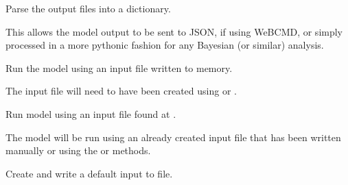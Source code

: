 \documentclass[letterpaper,10pt,english]{sphinxmanual}
\begin{document}
\begin{fulllineitems}
\begin{fulllineitems}
\end{fulllineitems}


\begin{fulllineitems}
\label{\detokenize{bcmdModel:bayescmd.bcmdModel.ModelBCMD.output_parse}}
Parse the output files into a dictionary.

This allows the model output to be sent to JSON, if using WeBCMD, or
simply processed in a more pythonic fashion for any Bayesian (or
similar) analysis.

\end{fulllineitems}


\begin{fulllineitems}
\label{\detokenize{bcmdModel:bayescmd.bcmdModel.ModelBCMD.run_from_buffer}}
Run the model using an input file written to memory.

The input file will need to have been created using
 or .

\end{fulllineitems}


\begin{fulllineitems}
\label{\detokenize{bcmdModel:bayescmd.bcmdModel.ModelBCMD.run_from_file}}
Run model using an input file found at {\hyperref[\detokenize{bcmdModel:bayescmd.bcmdModel.bcmd_model.ModelBCMD.input_file}]{}}.

The model will be run using an already created input file that has been
written manually or using the  or
 methods.

\end{fulllineitems}


\begin{fulllineitems}
\label{\detokenize{bcmdModel:bayescmd.bcmdModel.ModelBCMD.write_default_input}}
Create and write a default input to file.


\end{fulllineitems}
\end{fulllineitems}
\end{document}
